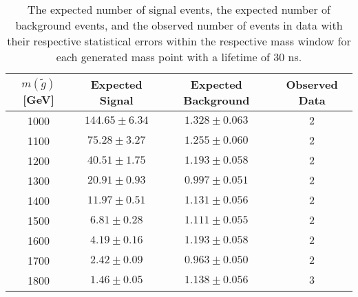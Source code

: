 \begin{table}[!htbp]
  \begin{center}
    \begin{tabular}{cccc}
      \hline
      $m(\tilde{g})$ [GeV]  & Expected Signal & Expected Background & Observed Data\\ 
      \hline
      1000    & $144.65 \pm 6.34 $ & $1.328 \pm 0.063 $ & $2$ \\
      1100    & $75.28 \pm 3.27 $  & $1.255 \pm 0.060 $ & $2$ \\
      1200    & $40.51 \pm 1.75 $  & $1.193 \pm 0.058 $ & $2$ \\
      1300    & $20.91 \pm 0.93 $  & $0.997 \pm 0.051 $ & $2$ \\
      1400    & $11.97 \pm 0.51 $  & $1.131 \pm 0.056 $ & $2$ \\
      1500    & $6.81 \pm 0.28 $   & $1.111 \pm 0.055 $ & $2$ \\
      1600    & $4.19 \pm 0.16 $   & $1.193 \pm 0.058 $ & $2$ \\
      1700    & $2.42 \pm 0.09 $   & $0.963 \pm 0.050 $ & $2$ \\
      1800    & $1.46 \pm 0.05 $   & $1.138 \pm 0.056 $ & $3$ \\
      \hline
    \end{tabular}
  \end{center}
  \caption{The expected number of signal events, the expected number of background events, and the observed number of events in data with their respective statistical errors within the respective mass window for each generated mass point with a lifetime of 30 ns.}
  \label{tab:app_counts_30ns}
\end{table}

